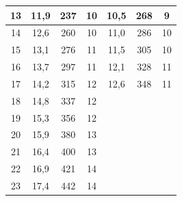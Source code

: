 \documentclass[a4paper,12pt]{article} %
\begin{document}
\begin{table}[H]
\begin{tabular}{|c|c|c|c|c|c|c|}
				13  & 11,9           & 237                   & 10       & 10,5           & 268                   & 9        \\ \hline
				14  & 12,6           & 260                   & 10       & 11,0           & 286                   & 10       \\ \hline
				15  & 13,1           & 276                   & 11       & 11,5           & 305                   & 10       \\ \hline
				16  & 13,7           & 297                   & 11       & 12,1           & 328                   & 11       \\ \hline
				17  & 14,2           & 315                   & 12       & 12,6           & 348                   & 11       \\ \hline
				18  & 14,8           & 337                   & 12       &                &                       &          \\ \hline
				19  & 15,3           & 356                   & 12       &                &                       &          \\ \hline
				20  & 15,9           & 380                   & 13       &                &                       &          \\ \hline
				21  & 16,4           & 400                   & 13       &                &                       &          \\ \hline
				22  & 16,9           & 421                   & 14       &                &                       &          \\ \hline
				23  & 17,4           & 442                   & 14       &                &                       &          \\ \hline
			\end{tabular}
		\end{table}
	
	\newpage
\end{document}

